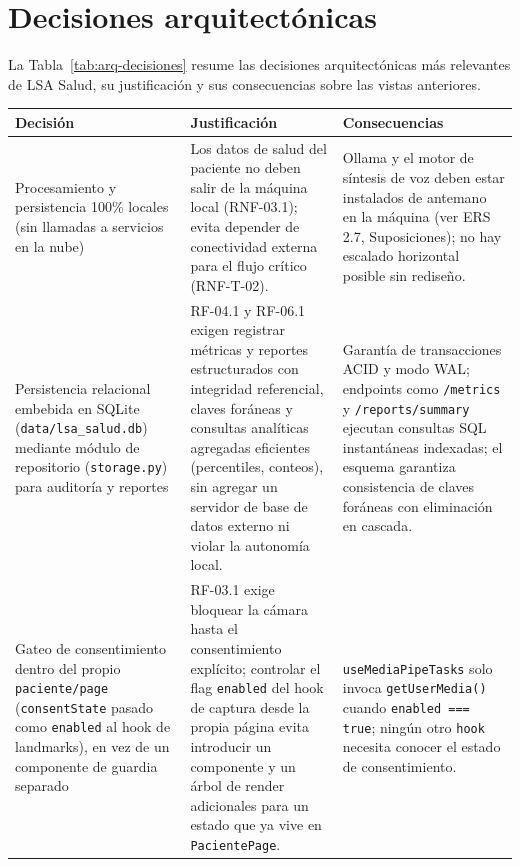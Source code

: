 \section{Decisiones arquitectónicas}
\label{sec:decisiones}

La Tabla~\ref{tab:arq-decisiones} resume las decisiones arquitectónicas más
relevantes de LSA Salud, su justificación y sus consecuencias sobre las
vistas anteriores.

\begin{longtable}{>{\raggedright\arraybackslash}p{4.25cm} >{\raggedright\arraybackslash}p{5.2cm} >{\raggedright\arraybackslash}p{5.2cm}}
    \toprule
    \textbf{Decisión} & \textbf{Justificación} & \textbf{Consecuencias} \\
    \midrule
    \endhead
    Procesamiento y persistencia 100\% locales (sin llamadas a servicios en
    la nube) &
    Los datos de salud del paciente no deben salir de la máquina local
    (RNF-03.1); evita depender de conectividad externa para el flujo crítico
    (RNF-T-02). &
    Ollama y el motor de síntesis de voz deben estar instalados de antemano
    en la máquina (ver ERS 2.7, Suposiciones); no hay escalado horizontal
    posible sin rediseño. \\

    Persistencia relacional embebida en SQLite (\texttt{data/lsa\_salud.db})
    mediante módulo de repositorio (\texttt{storage.py}) para auditoría y
    reportes &
    RF-04.1 y RF-06.1 exigen registrar métricas y reportes estructurados
    con integridad referencial, claves foráneas y consultas analíticas
    agregadas eficientes (percentiles, conteos), sin agregar un servidor
    de base de datos externo ni violar la autonomía local. &
    Garantía de transacciones ACID y modo WAL; endpoints como \texttt{/metrics}
    y \texttt{/reports/summary} ejecutan consultas SQL instantáneas indexadas;
    el esquema garantiza consistencia de claves foráneas con eliminación en cascada. \\

    Gateo de consentimiento dentro del propio \texttt{paciente/page}
    (\texttt{consentState} pasado como \texttt{enabled} al hook de
    landmarks), en vez de un componente de guardia separado &
    RF-03.1 exige bloquear la cámara hasta el consentimiento
    explícito; controlar el flag \texttt{enabled} del hook de captura desde
    la propia página evita introducir un componente y un árbol de render
    adicionales para un estado que ya vive en \texttt{PacientePage}. &
    \texttt{useMediaPipeTasks} solo invoca \texttt{getUserMedia()} cuando
    \texttt{enabled === true}; ningún otro \texttt{hook} necesita conocer el
    estado de consentimiento. \\


\end{longtable}
